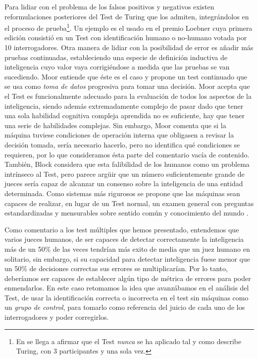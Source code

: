 \documentclass[12pt]{memoir}
\begin{document}
Para lidiar con el problema de los falsos positivos y negativos existen reformulaciones posteriores del Test de Turing que los admiten, integrándolos en el proceso de prueba\footnote{En \parencite[apartado 6.1]{afterTuring} se llega a afirmar que el Test \textit{nunca} se ha aplicado tal y como describe Turing, con 3 participantes y una sola vez.}. Un ejemplo es el usado en el premio Loebner \parencite[apartado 6.1]{afterTuring} cuya primera edición consistió en un Test con identificación humano o no-humano votada por 10 interrogadores. Otra manera de lidiar con la posibilidad de error es añadir más pruebas continuadas, estableciendo una especie de definición inductiva de inteligencia cuyo valor vaya corrigiéndose a medida que las pruebas se van sucediendo. Moor \parencite[apartado 3.4]{afterTuring} entiende que éste es el caso y propone un test continuado que se usa como \textit{toma de datos} progresiva para tomar una decisión. Moor acepta que el Test es funcionalmente adecuado para la evaluación de todos los aspectos de la inteligencia, siendo además extremadamente complejo de pasar dado que tener una sola habilidad cognitiva compleja aprendida no es suficiente, hay que tener una serie de habilidades complejas. Sin embargo, Moor comenta que si la máquina tuviese condiciones de operación interna que obligasen a revisar la decisión tomada, sería necesario hacerlo, pero no identifica qué condiciones se requieren, por lo que consideramos ésta parte del comentario vacía de contenido. También, Block \parencite[apartado 4.1]{afterTuring} considera que esta falibilidad de los humanos como un problema intrínseco al Test, pero parece argüir que un número suficientemente grande de jueces sería capaz de alcanzar un consenso sobre la inteligencia de una entidad determinada. Como sistemas más rigurosos se propone que las máquinas sean capaces de realizar, en lugar de un Test normal, un examen general con preguntas estandardizadas y mensurables sobre sentido común y conocimiento del mundo \parencite{standardTesting}.

Como comentario a los test múltiples que hemos presentado, entendemos que varios jueces humanos, de ser capaces de detectar correctamente la inteligencia más de un 50\% de las veces tendrían más exito de media que un juez humano en solitario, sin embargo, si su capacidad para detectar inteligencia fuese menor que un 50\% de decisiones correctas sus errores se multiplicarían. Por lo tanto, deberíamos ser capaces de establecer algún tipo de métrica de errores para poder enmendarlos. En este caso retomamos la idea que avanzábamos en el análisis del Test, de usar la identificación correcta o incorrecta en el test sin máquinas como un \textit{grupo de control}, para tomarlo como referencia del juicio de cada uno de los interrogadores y poder corregirlos.
\end{document}
